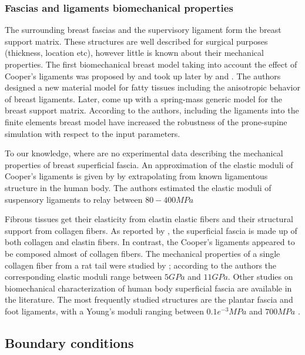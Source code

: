 \subsubsection*{Fascias and ligaments biomechanical properties}
The surrounding breast fascias and the supervisory ligament form the breast support matrix. These structures are well described for surgical purposes (thickness, location etc), however little is known about their mechanical properties. The first biomechanical breast model taking into account the effect of Cooper's ligaments was proposed by \cite{azar_methods_2002} and took up later by \cite{pathmanathan_predicting_2008} and \cite{han_development_2012}. The authors designed a new material model for fatty tissues including the anisotropic behavior of breast ligaments. Later, \cite{georgii_simulation_2016} come up with a spring-mass generic model for the breast support matrix. According to the authors, including the ligaments into the finite elements breast model have increased the robustness of the prone-supine simulation with respect to the input parameters. 

 To our knowledge, where are no experimental data describing the mechanical properties of breast superficial fascia. An approximation of the elastic moduli of Cooper's ligaments is given by \cite{gefen_mechanics_2007} by extrapolating from known ligamentous structure in the human body. The authors estimated the elastic moduli of suspensory ligaments to relay between $80 - 400 MPa$
 
 Fibrous tissues get their elasticity from elastin elastic fibers and their structural support from collagen fibers. As reported by \cite{riggio_anatomical_2000}, the superficial fascia is made up of both collagen and elastin fibers. In contrast, the Cooper's ligaments appeared to be composed almost of collagen fibers.  The mechanical properties of a single collagen fiber from a rat tail were studied by \cite{wenger_mechanical_2007}; according to the authors the corresponding elastic moduli range between $5 GPa$ and $11 GPa$. Other studies on biomechanical characterization of human body superficial fascia are available in the literature. The most frequently studied structures are the plantar fascia and foot ligaments, with a Young's moduli ranging between $0.1e^{-3} MPa$ \citep{gefen_vivo_2003} and $700 MPa$ \citep{cheung_effects_2004}. 

\subsection{Boundary conditions}

